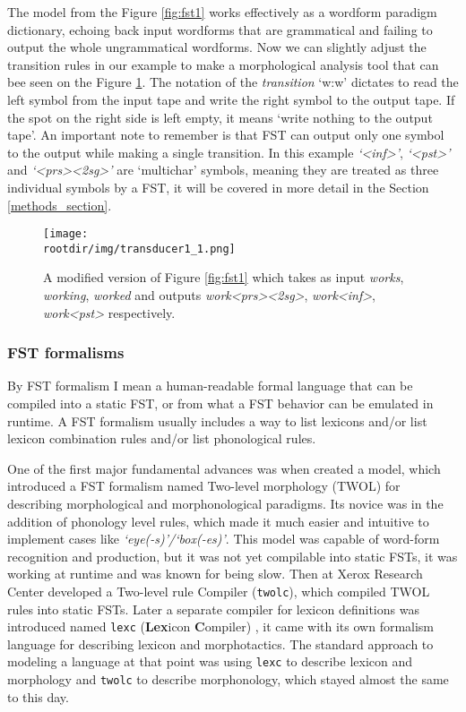 The model from the Figure \ref{fig:fst1} works effectively as a wordform paradigm dictionary, echoing back input wordforms that are grammatical and failing to output the whole ungrammatical wordforms. Now we can slightly adjust the transition rules in our example to make a morphological analysis tool that can bee seen on the Figure \ref{fig:fst1_1}. The notation of the \textit{transition} `w:w' dictates to read the left symbol from the input tape and write the right symbol to the output tape. If the spot on the right side is left empty, it means `write nothing to the output tape'. An important note to remember is that FST can output only one symbol to the output while making a single transition. In this example \textit{`<inf>'}, \textit{`<pst>'} and \textit{`<prs><2sg>'} are `multichar' symbols, meaning they are treated as three individual symbols by a FST, it will be covered in more detail in the Section \ref{methods_section}.

\begin{figure}[!h]
    \centering
    \texttt{[image: \\rootdir/img/transducer1\_1.png]}
    \caption{A modified version of Figure \ref{fig:fst1} which takes as input \textit{works}, \textit{working}, \textit{worked} and outputs \textit{work<prs><2sg>}, \textit{work<inf>}, \textit{work<pst>} respectively.}
    \label{fig:fst1_1}
\end{figure}

\subsubsection{FST formalisms}
By FST formalism I mean a human-readable formal language that can be compiled into a static FST, or from what a FST behavior can be emulated in runtime. A FST formalism usually includes a way to list lexicons and/or list lexicon combination rules and/or list phonological rules.

One of the first major fundamental advances was when \parencite{koskenniemi_twol_1983} created a model, which introduced a FST formalism named Two-level morphology (TWOL) for describing morphological and morphonological paradigms. Its novice was in the addition of phonology level rules, which made it much easier and intuitive to implement cases like \textit{`eye(-s)'/`box(-es)'}. This model was capable of word-form recognition and production, but it was not yet compilable into static FSTs, it was working at runtime and was known for being slow. Then \textcite{karttunen_twolc_1987} at Xerox Research Center developed a Two-level rule Compiler (\texttt{twolc}), which compiled TWOL rules into static FSTs. Later a separate compiler for lexicon definitions was introduced named \texttt{lexc} (\textbf{Lex}icon \textbf{C}ompiler) \parencite{karttunen_lexc_1993}, it came with its own formalism language for describing lexicon and morphotactics. The standard approach to modeling a language at that point was using \texttt{lexc} to describe lexicon and morphology and \texttt{twolc} to describe morphonology, which stayed almost the same to this day. 

